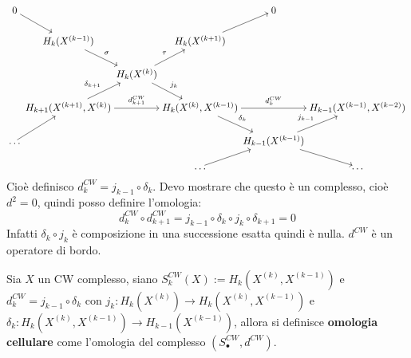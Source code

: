 \[
  \begin{tikzcd}[nodes={column sep=1pt, inner sep=2pt, outer sep=1pt}]
  0            \arrow{dr}{}      & {}                   & {}                                         & {}                           & 0  & {}\\
  {}                              & H_k(X^{(k-1)})   \arrow{dr}{\sigma}                 & {}                                    & H_k(X^{(k+1)})  \arrow{ur}{} & {} & {}\\
  {}                             & {}             & H_k(X^{(k)})   \arrow{dr}{j_k}   \arrow{ur}{\tau} & {}                           & {} & {}\\
  {}  & H_{k+1}(X^{(k+1)}, X^{(k)})  \arrow{ur}{\delta_{k+1}} \arrow{rr}{d_{k+1}^{CW}} & {}      & H_k(X^{(k)}, X^{(k-1)})  \arrow{rr}{d_{k}^{CW}}   \arrow{dr}{\delta_k}  & {} &  H_{k-1}(X^{(k-1)}, X^{(k-2)}) \\
  \dots \arrow{ur}{} & {} & {} & {} & H_{k-1}(X^{(k-1)}) \arrow{ur}{j_{k-1}} \arrow{dr}{} & {} \\
  {} & {} & {} & \dots \arrow{ur}{} & {} & \dots
\end{tikzcd}
\]
Cioè definisco $ d_k^{CW} = j_{k-1} \circ \delta_k $. Devo mostrare che questo è un complesso, cioè $ d^2 = 0 $,
quindi posso definire l'omologia:
\[
   d_k^{CW} \circ  d_{k+1}^{CW} = j_{k-1} \circ \delta_k \circ j_k \circ \delta_{k+1} = 0
\]
Infatti $ \delta_k \circ j_k $ è composizione in una successione esatta quindi è nulla.
$ d^{CW} $ è un operatore di bordo.

\begin{definition}
  Sia $ X $ un CW complesso, siano $ S_k^{CW}(X) := H_k(X^{(k)}, X^{(k-1)}) $ e $ d_k^{CW} = j_{k-1} \circ \delta_k $
  con $ j_k \colon H_k(X^{(k)}) \to H_k(X^{(k)}, X^{(k-1)}) $ e $ \delta_k \colon H_k(X^{(k)}, X^{(k-1)}) \to  H_{k-1}(X^{(k-1)})  $,
  allora si definisce \textbf{omologia cellulare}
  come l'omologia del complesso $ (S_\bullet^{CW}, d^{CW}) $.
\end{definition}

